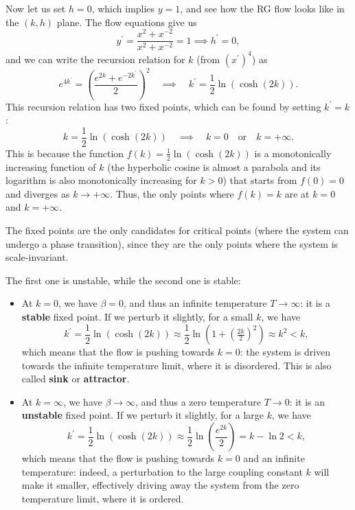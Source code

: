 Now let us set \(h=0\), which implies \(y=1\), and see how the RG flow looks like in the \((k, h)\) plane. The flow equations give us
\[
    y^{\prime} = \frac{x^2 + x^{-2}}{x^2 + x^{-2}} = 1 \implies h^{\prime} = 0,
\]
and we can write the recursion relation for \(k\) (from \((x^{\prime})^4\)) as
\[
    e^{4k^{\prime}} = \left(\frac{e^{2k} + e^{-2k^{\prime}}}{2}\right)^2 \quad \implies \quad k^{\prime} = \frac{1}{2} \ln \left(\cosh(2k)\right).
\]
This recursion relation has two fixed points, which can be found by setting \(k^{\prime} = k\):
\[
    k = \frac{1}{2} \ln \left(\cosh(2k)\right) \quad \implies \quad k = 0 \quad \text{or} \quad k = +\infty.
\]
This is because the function \(f(k) = \frac{1}{2} \ln \left(\cosh(2k)\right)\) is a monotonically increasing function of \(k\) (the hyperbolic cosine is almost a parabola and its logarithm is also monotonically increasing for \(k > 0\)) that starts from \(f(0) = 0\) and diverges as \(k \to +\infty\). Thus, the only points where \(f(k) = k\) are at \(k = 0\) and \(k = +\infty\).

The fixed points are the only candidates for critical points (where the system can undergo a phase transition), since they are the only points where the system is scale-invariant.

The first one is unstable, while the second one is stable:
\begin{itemize}
    \item At \(k = 0\), we have \(\beta = 0\), and thus an infinite temperature \(T \to \infty\): it is a \textbf{stable} fixed point. If we perturb it slightly, for a small \(k\), we have
          \[
              k^{\prime} = \frac{1}{2} \ln \left(\cosh(2k)\right) \approx \frac{1}{2}\ln(1 + \left(\tfrac{2k}{2}\right)^2) \approx k^2 < k,
          \]
          which means that the flow is pushing towards \(k = 0\): the system is driven towards the infinite temperature limit, where it is disordered. This is also called \textbf{sink} or \textbf{attractor}.
    \item At \(k = \infty\), we have \(\beta \to \infty\), and thus a zero temperature \(T \to 0\): it is an \textbf{unstable} fixed point. If we perturb it slightly, for a large \(k\), we have
          \[
              k^{\prime} = \frac{1}{2} \ln \left(\cosh(2k)\right) \approx \frac{1}{2} \ln \left(\frac{e^{2k}}{2}\right) = k - \ln 2 < k,
          \]
          which means that the flow is pushing towards \(k = 0\) and an infinite temperature: indeed, a perturbation to the large coupling constant \(k\) will make it smaller, effectively driving away the system from the zero temperature limit, where it is ordered.
\end{itemize}

